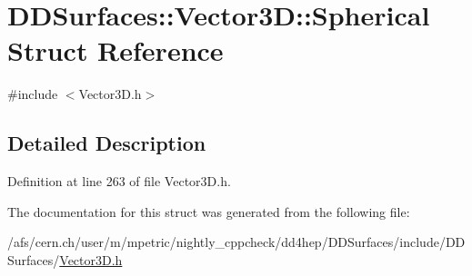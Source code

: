 \hypertarget{struct_d_d_surfaces_1_1_vector3_d_1_1_spherical}{}\section{D\+D\+Surfaces\+:\+:Vector3D\+:\+:Spherical Struct Reference}
\label{struct_d_d_surfaces_1_1_vector3_d_1_1_spherical}


{\ttfamily \#include $<$Vector3\+D.\+h$>$}



\subsection{Detailed Description}


Definition at line 263 of file Vector3\+D.\+h.



The documentation for this struct was generated from the following file\+:\begin{DoxyCompactItemize}
\item 
/afs/cern.\+ch/user/m/mpetric/nightly\+\_\+cppcheck/dd4hep/\+D\+D\+Surfaces/include/\+D\+D\+Surfaces/\hyperlink{_vector3_d_8h}{Vector3\+D.\+h}\end{DoxyCompactItemize}
